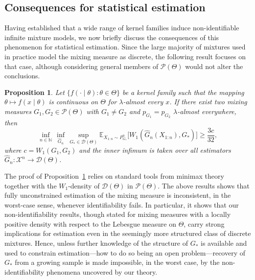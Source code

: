 \documentclass[11pt,twoside]{article} %
\newtheorem{proposition}{Proposition}
\begin{document}
\subsection{Consequences for statistical estimation}\label{sec:statistical_estimation}


Having established that a wide range of kernel families induce
non-identifiable infinite mixture models, we now briefly discuss the consequences of
this phenomenon for statistical estimation. Since the large majority of
mixtures used in practice model the mixing measure as discrete, the following
result focuses on that case, although considering general members of
$\mathcal P(\Theta)$ would not alter the conclusions.
\begin{proposition}
\label{pro:statistical_estimation}
Let $\{f(\cdot\mid \theta) : \theta\in\Theta\}$ be a kernel family such that the mapping $\theta\mapsto f(x\mid\theta)$ is continuous on $\Theta$ for $\lambda$-almost every $x$. If there exist two mixing measures $G_1,G_2\in\mathcal P(\Theta)$ with $G_1\neq G_2$ and
$p_{G_1}=p_{G_2}$ $\lambda$-almost everywhere, then
%
$$ \inf_{n\in\mathbb N} \,\inf_{\hat{G}_n}\, \sup_{G_* \in \mathcal{D}(\Theta)} \mathbb{E}_{X_{1:n}\sim P_{G_{*}}^n} \big[ W_1(\widehat{G}_n(X_{1:n}), G_{*}) \big] \geq \frac{3c}{32},$$
%
where $c = W_{1}(G_{1}, G_{2})$ and the inner infimum is taken over all estimators $\widehat G_n:\mathcal X^n\to\mathcal D(\Theta)$.
\end{proposition}



The proof of Proposition~\ref{pro:statistical_estimation} relies on standard
tools from minimax theory together with the $W_1$-density of
$\mathcal D(\Theta)$ in $\mathcal P(\Theta)$. The above results shows that fully unconstrained
estimation of the mixing measure is inconsistent, in the worst-case sense,
whenever identifiability fails. In particular, it shows that our non-identifiability results,
though stated for mixing measures with a locally positive density with respect
to the Lebesgue measure on $\Theta$, carry strong implications for estimation
even in the seemingly more structured class of discrete
mixtures. Hence, unless further knowledge of the structure of $G_*$ is
available and used to constrain estimation---how to do so being an open
problem---recovery of $G_*$ from a growing sample is made impossible, in
the worst case, by the non-identifiability phenomena uncovered by our theory.
\end{document}
